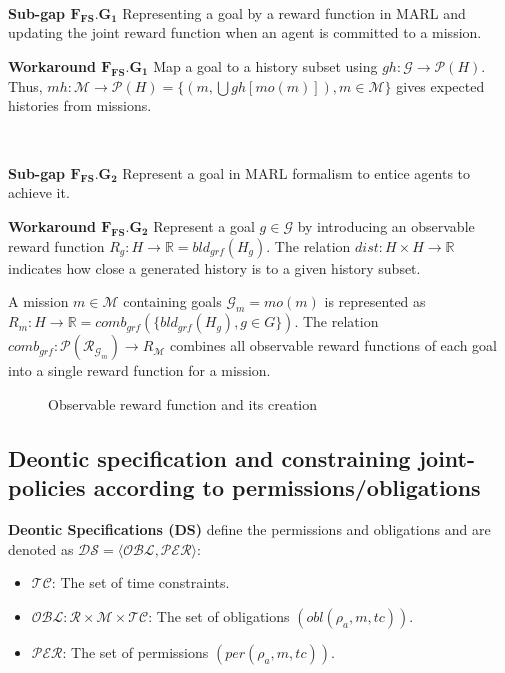 \documentclass[conference]{IEEEtran}
\newcounter{relation}
\begin{document}
\

\textbf{Sub-gap $\mathbf{F_{FS}.G_1}$} \quad Representing a goal by a reward function in MARL and updating the joint reward function when an agent is committed to a mission.

\textbf{Workaround $\mathbf{F_{FS}.G_1}$} \quad Map a goal to a history subset using $gh: \mathcal{G} \rightarrow \mathcal{P}(H)$. Thus, $mh: \mathcal{M} \rightarrow \mathcal{P}(H) = \{(m,\bigcup gh[mo(m)]), m \in \mathcal{M}\}$ gives expected histories from missions.

\

\textbf{Sub-gap $\mathbf{F_{FS}.G_2}$} \quad Represent a goal in MARL formalism to entice agents to achieve it.

\textbf{Workaround $\mathbf{F_{FS}.G_2}$} \quad Represent a goal $g \in \mathcal{G}$ by introducing an observable reward function $R_{g}: H \rightarrow \mathbb{R} = bld_{grf}(H_g)$. The relation $dist: H \times H \rightarrow \mathbb{R}$ indicates how close a generated history is to a given history subset.

A mission $m \in \mathcal{M}$ containing goals $\mathcal{G}_{m} = mo(m)$ is represented as $R_m: H \rightarrow \mathbb{R} = comb_{grf}(\{bld_{grf}(H_g), g \in G\})$. The relation $comb_{grf}: \mathcal{P}(\mathcal{R}_{\mathcal{G}_{m}}) \rightarrow R_{\mathcal{M}}$ combines all observable reward functions of each goal into a single reward function for a mission.

\begin{figure}[h!]
    \centering
    
    \caption{Observable reward function and its creation}
    \label{fig:goal_mission_scheme}
\end{figure}



\subsection{Deontic specification and constraining joint-policies according to permissions/obligations}

\textbf{Deontic Specifications (DS)} define the permissions and obligations and are denoted as $\mathcal{DS} = \langle \mathcal{OBL}, \mathcal{PER} \rangle$:

\begin{itemize}
    \item $\mathcal{TC}$: The set of time constraints.
    \item $\mathcal{OBL}: \mathcal{R} \times \mathcal{M} \times \mathcal{TC}$: The set of obligations $(obl(\rho_a, m, tc))$.
    \item $\mathcal{PER}$: The set of permissions $(per(\rho_a, m, tc))$.
\end{itemize}
\end{document}
